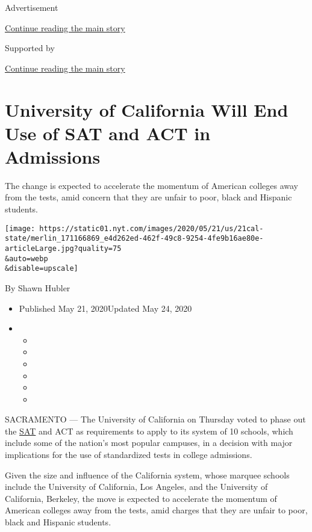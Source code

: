 Advertisement

\protect\hyperlink{after-top}{Continue reading the main story}

Supported by

\protect\hyperlink{after-sponsor}{Continue reading the main story}

\hypertarget{university-of-california-will-end-use-of-sat-and-act-in-admissions}{%
\section{University of California Will End Use of SAT and ACT in
Admissions}\label{university-of-california-will-end-use-of-sat-and-act-in-admissions}}

The change is expected to accelerate the momentum of American colleges
away from the tests, amid concern that they are unfair to poor, black
and Hispanic students.

\texttt{[image: https://static01.nyt.com/images/2020/05/21/us/21cal-state/merlin\_171166869\_e4d262ed-462f-49c8-9254-4fe9b16ae80e-articleLarge.jpg?quality=75\\\&auto=webp\\\&disable=upscale]}

By Shawn Hubler

\begin{itemize}
\item
  Published May 21, 2020Updated May 24, 2020
\item
  \begin{itemize}
  \item
  \item
  \item
  \item
  \item
  \item
  \end{itemize}
\end{itemize}

SACRAMENTO --- The University of California on Thursday voted to phase
out the
\href{https://www.nytimes.com/2020/06/02/us/at-home-sat-coronavirus.html}{SAT}
and ACT as requirements to apply to its system of 10 schools, which
include some of the nation's most popular campuses, in a decision with
major implications for the use of standardized tests in college
admissions.

Given the size and influence of the California system, whose marquee
schools include the University of California, Los Angeles, and the
University of California, Berkeley, the move is expected to accelerate
the momentum of American colleges away from the tests, amid charges that
they are unfair to poor, black and Hispanic students.

